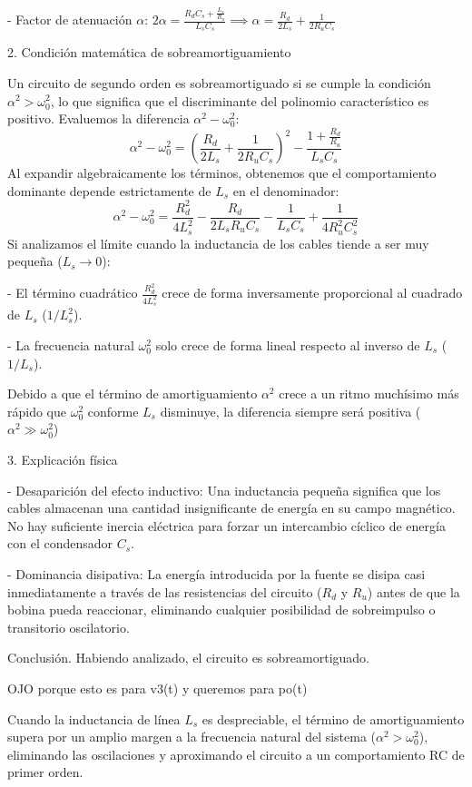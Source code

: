 \documentclass[11pt, a4paper]{article}
\theoremstyle{definition}
\theoremstyle{plain}
\theoremstyle{plain}
\theoremstyle{remark}
\theoremstyle{remark}
\theoremstyle{remark}
\begin{document}
- Factor de atenuación $\alpha$: $2\alpha = \frac{R_d C_s + \frac{L_s}{R_u}}{L_s C_s} \implies \alpha = \frac{R_d}{2L_s} + \frac{1}{2R_u C_s}$



2. Condición matemática de sobreamortiguamiento

Un circuito de segundo orden es sobreamortiguado si se cumple la condición $\alpha^2 > \omega_0^2$, lo que significa que el discriminante del polinomio característico es positivo. Evaluemos la diferencia $\alpha^2 - \omega_0^2$:
$$\alpha^2 - \omega_0^2 = \left( \frac{R_d}{2L_s} + \frac{1}{2R_u C_s} \right)^2 - \frac{1 + \frac{R_d}{R_u}}{L_s C_s}$$ 
Al expandir algebraicamente los términos, obtenemos que el comportamiento dominante depende estrictamente de $L_s$ en el denominador:
$$\alpha^2 - \omega_0^2 = \frac{R_d^2}{4L_s^2} - \frac{R_d}{2L_s R_u C_s} - \frac{1}{L_s C_s} + \frac{1}{4R_u^2 C_s^2}$$ 
Si analizamos el límite cuando la inductancia de los cables tiende a ser muy pequeña ($L_s \to 0$):

- El término cuadrático $\frac{R_d^2}{4L_s^2}$ crece de forma inversamente proporcional al cuadrado de $L_s$ ($1/L_s^2$).

- La frecuencia natural $\omega_0^2$ solo crece de forma lineal respecto al inverso de $L_s$ ($1/L_s$).

Debido a que el término de amortiguamiento $\alpha^2$ crece a un ritmo muchísimo más rápido que $\omega_0^2$ conforme $L_s$ disminuye, la diferencia siempre será positiva ($\alpha^2 \gg \omega_0^2$)

3. Explicación física

- Desaparición del efecto inductivo: Una inductancia pequeña significa que los cables almacenan una cantidad insignificante de energía en su campo magnético. No hay suficiente inercia eléctrica para forzar un intercambio cíclico de energía con el condensador $C_s$.

- Dominancia disipativa: La energía introducida por la fuente se disipa casi inmediatamente a través de las resistencias del circuito ($R_d$ y $R_u$) antes de que la bobina pueda reaccionar, eliminando cualquier posibilidad de sobreimpulso o transitorio oscilatorio.


{\color{red} Conclusión. Habiendo analizado, el circuito es sobreamortiguado. 
	
	OJO porque esto es para v3(t) y queremos para po(t)}


Cuando la inductancia de línea $L_s$ es despreciable, el término de amortiguamiento supera por un amplio margen a la frecuencia natural del sistema ($\alpha^2 > \omega_0^2$), eliminando las oscilaciones y aproximando el circuito a un comportamiento RC de primer orden.
\end{document}
